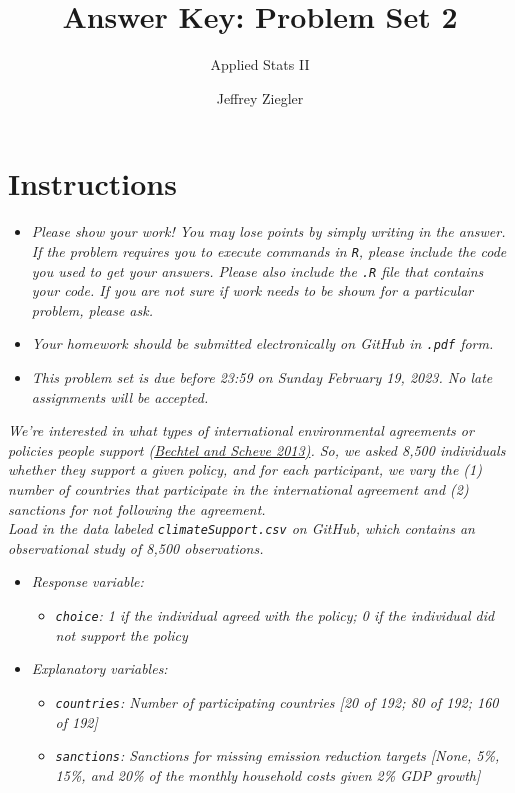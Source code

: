 \documentclass[12pt,letterpaper]{article}
\title{Answer Key: Problem Set 2}
\date{Jeffrey Ziegler}
\author{Applied Stats II}
\begin{document}
	\maketitle
	
	\section*{Instructions}
	\begin{itemize}
		\item \textit{Please show your work! You may lose points by simply writing in the answer. If the problem requires you to execute commands in \texttt{R}, please include the code you used to get your answers. Please also include the \texttt{.R} file that contains your code. If you are not sure if work needs to be shown for a particular problem, please ask.}
			\item \textit{Your homework should be submitted electronically on GitHub in \texttt{.pdf} form.}
			\item \textit{This problem set is due before 23:59 on Sunday February 19, 2023. No late assignments will be accepted.}
	\end{itemize}
	
	\vspace{.25cm}

\noindent \textit{We're interested in what types of international environmental agreements or policies people support (\href{https://www.pnas.org/content/110/34/13763}{Bechtel and Scheve 2013)}. So, we asked 8,500 individuals whether they support a given policy, and for each participant, we vary the (1) number of countries that participate in the international agreement and (2) sanctions for not following the agreement.} \\

\noindent \textit{Load in the data labeled \texttt{climateSupport.csv} on GitHub, which contains an observational study of 8,500 observations.}

\begin{itemize}
	\item \textit{
	Response variable:} 
	\begin{itemize}
		\item \textit{ \texttt{choice}: 1 if the individual agreed with the policy; 0 if the individual did not support the policy}
	\end{itemize}
	\item \textit{
	Explanatory variables: }
	\begin{itemize}
		\item \textit{
		\texttt{countries}: Number of participating countries [20 of 192; 80 of 192; 160 of 192]}
		\item \textit{
		\texttt{sanctions}: Sanctions for missing emission reduction targets [None, 5\%, 15\%, and 20\% of the monthly household costs given 2\% GDP growth]}
		
	\end{itemize}
	
\end{itemize}
\end{document}
